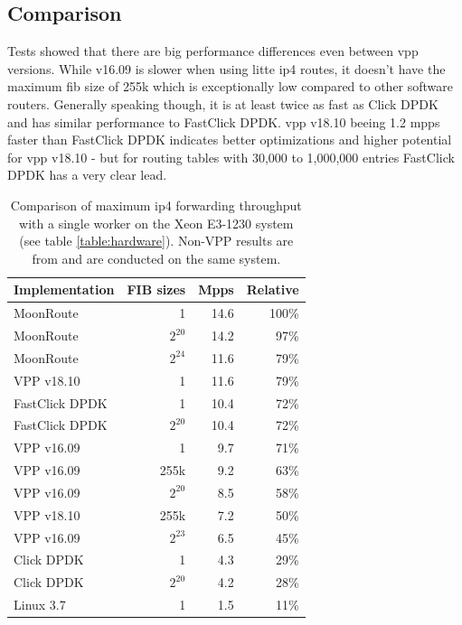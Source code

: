 

\subsection{Comparison}

Tests showed that there are big performance differences even between
\Ac{vpp} versions. While v16.09 is slower when using litte \Ac{ip4}
routes, it doesn't have the maximum \Ac{fib} size of 255k which is
exceptionally low compared to other software routers. Generally
speaking though, it is at least twice as fast as Click DPDK and has
similar performance to FastClick DPDK. \Ac{vpp} v18.10 beeing 1.2 mpps
faster than FastClick DPDK indicates better optimizations and higher
potential for \Ac{vpp} v18.10 - but for routing tables with 30,000 to
1,000,000 entries FastClick DPDK has a very clear lead.


\begin{table}[!ht]
	\vspace{5ex}
	\begin{tabular}[]{ l r r r }
		Implementation	 & FIB sizes & Mpps		& Relative \\ 
		\midrule
		MoonRoute		 & 1		 & 14.6		& 100\% \\
		MoonRoute		 & $2^{20}$	 & 14.2		& 97\% \\
		MoonRoute		 & $2^{24}$	 & 11.6		& 79\% \\
		VPP v18.10		 & 1		 & 11.6		& 79\% \\
		FastClick DPDK	 & 1		 & 10.4 	& 72\% \\
		FastClick DPDK	 & $2^{20}$	 & 10.4 	& 72\% \\
		VPP v16.09		 & 1		 & 9.7	 	& 71\% \\
		VPP v16.09		 & 255k		 & 9.2	 	& 63\% \\
		VPP v16.09		 & $2^{20}$	 & 8.5	 	& 58\% \\
		VPP v18.10		 & 255k		 & 7.2	 	& 50\% \\
		VPP v16.09		 & $2^{23}$	 & 6.5	 	& 45\% \\
		Click DPDK		 & 1		 & 4.3 		& 29\% \\
		Click DPDK		 & $2^{20}$	 & 4.2 		& 28\% \\
		Linux 3.7		 & 1		 & 1.5 		& 11\% \\

		\midrule
	\end{tabular}
	\caption{Comparison of maximum \Ac{ip4} forwarding throughput with a single worker on the Xeon E3-1230 system (see table \ref{table:hardware}). Non-VPP results are from \cite{chair:architecture} and are conducted on the same system. }
	\label{table:comparison}
\end{table}


